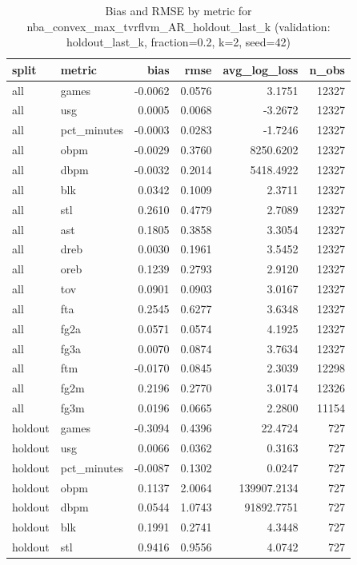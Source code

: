 \begin{table}
\caption{Bias and RMSE by metric for nba_convex_max_tvrflvm_AR_holdout_last_k (validation: holdout_last_k, fraction=0.2, k=2, seed=42)}
\label{tab:nba_convex_max_tvrflvm_AR_holdout_last_k_vs_holdout_last_k_f20_k2_s42_bias_rmse}
\begin{tabular}{llrrrr}
\toprule
split & metric & bias & rmse & avg\_log\_loss & n\_obs \\
\midrule
all & games & -0.0062 & 0.0576 & 3.1751 & 12327 \\
all & usg & 0.0005 & 0.0068 & -3.2672 & 12327 \\
all & pct\_minutes & -0.0003 & 0.0283 & -1.7246 & 12327 \\
all & obpm & -0.0029 & 0.3760 & 8250.6202 & 12327 \\
all & dbpm & -0.0032 & 0.2014 & 5418.4922 & 12327 \\
all & blk & 0.0342 & 0.1009 & 2.3711 & 12327 \\
all & stl & 0.2610 & 0.4779 & 2.7089 & 12327 \\
all & ast & 0.1805 & 0.3858 & 3.3054 & 12327 \\
all & dreb & 0.0030 & 0.1961 & 3.5452 & 12327 \\
all & oreb & 0.1239 & 0.2793 & 2.9120 & 12327 \\
all & tov & 0.0901 & 0.0903 & 3.0167 & 12327 \\
all & fta & 0.2545 & 0.6277 & 3.6348 & 12327 \\
all & fg2a & 0.0571 & 0.0574 & 4.1925 & 12327 \\
all & fg3a & 0.0070 & 0.0874 & 3.7634 & 12327 \\
all & ftm & -0.0170 & 0.0845 & 2.3039 & 12298 \\
all & fg2m & 0.2196 & 0.2770 & 3.0174 & 12326 \\
all & fg3m & 0.0196 & 0.0665 & 2.2800 & 11154 \\
holdout & games & -0.3094 & 0.4396 & 22.4724 & 727 \\
holdout & usg & 0.0066 & 0.0362 & 0.3163 & 727 \\
holdout & pct\_minutes & -0.0087 & 0.1302 & 0.0247 & 727 \\
holdout & obpm & 0.1137 & 2.0064 & 139907.2134 & 727 \\
holdout & dbpm & 0.0544 & 1.0743 & 91892.7751 & 727 \\
holdout & blk & 0.1991 & 0.2741 & 4.3448 & 727 \\
holdout & stl & 0.9416 & 0.9556 & 4.0742 & 727 \\

\end{tabular}
\end{table}
